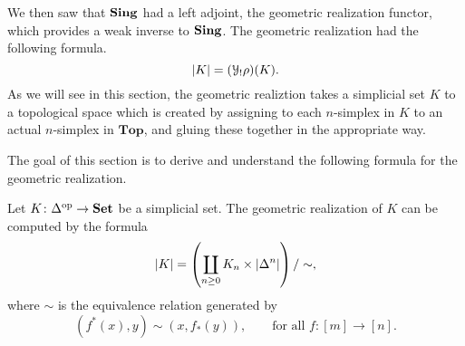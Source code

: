 \documentclass[main.tex]{subfiles}
\begin{document}
We then saw that $\mathbf{Sing}$ had a left adjoint, the geometric realization functor, which provides a weak inverse to $\mathbf{Sing}$. The geometric realization had the following formula.
\begin{equation*}
  {| K |} = (\mathcal{Y}_{!}\rho)(K).
\end{equation*}
As we will see in this section, the geometric realiztion takes a simplicial set $K$ to a topological space which is created by assigning to each $n$-simplex in $K$ to an actual $n$-simplex in $\mathbf{Top}$, and gluing these together in the appropriate way.

The goal of this section is to derive and understand the following formula for the geometric realization.

\begin{theorem}
  \label{thm:formula_for_geometric_realization}
  Let $K\colon \Delta^{\mathrm{op}} \to \mathbf{Set}$ be a simplicial set. The geometric realization of $K$ can be computed by the formula
  \begin{equation*}
    {| K |} = \left( \coprod_{n \geq 0} K_{n} \times {| \Delta^{n} |} \right) /\sim,
  \end{equation*}
  where $\sim$ is the equivalence relation generated by
  \begin{equation*}
    (f^{*}(x), y) \sim (x, f_{*}(y)),\qquad \text{for all } f\colon[m] \to [n].
  \end{equation*}
\end{theorem}
\end{document}
